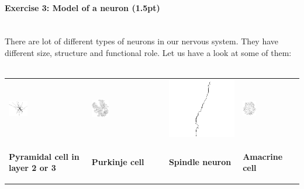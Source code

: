 \documentclass[a4paper,11pt]{article}
\newenvironment{exercise}[3]{\paragraph{Exercise #1: #2 (#3pt)}\ \\}{
\medskip}
\begin{document}
\begin{exercise}{3}{Model of a neuron}{1.5}
There are lot of different types of neurons in our nervous system. They have different size, structure and functional role. Let us have a look at some of them:\\
\ \\
\begin{tabular}{p{3.7cm} p{3.7cm} p{3.7cm} p{3.7cm}}
\includegraphics[width=0.25\textwidth]{pyramidal2.png} &
\includegraphics[width=0.25\textwidth]{purkinje.png} &
\includegraphics[height=0.25\textwidth]{spindle.png} &
\includegraphics[width=0.25\textwidth]{amacrine.png}\\

\begin{center}\textbf{Pyramidal cell in layer 2 or 3}\end{center}&
\begin{center}\textbf{Purkinje cell}\end{center}&
\begin{center}\textbf{Spindle neuron}\end{center}&
\begin{center}\textbf{Amacrine cell}\end{center} \\


\end{tabular}
\end{exercise}
\end{document}
